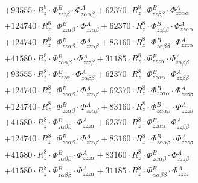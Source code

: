 \documentclass{article}
\begin{document}
\begin{subequations}
\begin{gather}
\begin{array}{c}
 \\[0.2em] 		 + 93555 \cdot R_{z}^{8} \cdot \Phi{}^{B}_{zzz\beta{}} \cdot \Phi{}^{A}_{z\alpha{}\alpha{}\beta{}}+ 62370 \cdot R_{z}^{8} \cdot \Phi{}^{B}_{zz\beta{}\beta{}} \cdot \Phi{}^{A}_{zz\alpha{}\alpha{}} 
 \\[0.2em] 		 + 124740 \cdot R_{z}^{8} \cdot \Phi{}^{B}_{zz\alpha{}\beta{}} \cdot \Phi{}^{A}_{zz\alpha{}\beta{}}+ 62370 \cdot R_{z}^{8} \cdot \Phi{}^{B}_{zz\beta{}\beta{}} \cdot \Phi{}^{A}_{zz\alpha{}\alpha{}} 
 \\[0.2em] 		 + 124740 \cdot R_{z}^{8} \cdot \Phi{}^{B}_{zz\alpha{}\beta{}} \cdot \Phi{}^{A}_{zz\alpha{}\beta{}}+ 83160 \cdot R_{z}^{8} \cdot \Phi{}^{B}_{z\alpha{}\beta{}\beta{}} \cdot \Phi{}^{A}_{zzz\alpha{}} 
 \\[0.2em] 		 + 41580 \cdot R_{z}^{8} \cdot \Phi{}^{B}_{z\alpha{}\alpha{}\beta{}} \cdot \Phi{}^{A}_{zzz\beta{}}+ 31185 \cdot R_{z}^{8} \cdot \Phi{}^{B}_{zzz\alpha{}} \cdot \Phi{}^{A}_{z\alpha{}\beta{}\beta{}} 
 \\[0.2em] 		 + 93555 \cdot R_{z}^{8} \cdot \Phi{}^{B}_{zzz\alpha{}} \cdot \Phi{}^{A}_{z\alpha{}\beta{}\beta{}}+ 62370 \cdot R_{z}^{8} \cdot \Phi{}^{B}_{zz\alpha{}\alpha{}} \cdot \Phi{}^{A}_{zz\beta{}\beta{}} 
 \\[0.2em] 		 + 124740 \cdot R_{z}^{8} \cdot \Phi{}^{B}_{zz\alpha{}\beta{}} \cdot \Phi{}^{A}_{zz\alpha{}\beta{}}+ 62370 \cdot R_{z}^{8} \cdot \Phi{}^{B}_{zz\alpha{}\alpha{}} \cdot \Phi{}^{A}_{zz\beta{}\beta{}} 
 \\[0.2em] 		 + 124740 \cdot R_{z}^{8} \cdot \Phi{}^{B}_{zz\alpha{}\beta{}} \cdot \Phi{}^{A}_{zz\alpha{}\beta{}}+ 83160 \cdot R_{z}^{8} \cdot \Phi{}^{B}_{z\alpha{}\alpha{}\beta{}} \cdot \Phi{}^{A}_{zzz\beta{}} 
 \\[0.2em] 		 + 41580 \cdot R_{z}^{8} \cdot \Phi{}^{B}_{z\alpha{}\beta{}\beta{}} \cdot \Phi{}^{A}_{zzz\alpha{}}+ 62370 \cdot R_{z}^{8} \cdot \Phi{}^{B}_{zz\alpha{}\alpha{}} \cdot \Phi{}^{A}_{zz\beta{}\beta{}} 
 \\[0.2em] 		 + 124740 \cdot R_{z}^{8} \cdot \Phi{}^{B}_{zz\alpha{}\beta{}} \cdot \Phi{}^{A}_{zz\alpha{}\beta{}}+ 83160 \cdot R_{z}^{8} \cdot \Phi{}^{B}_{z\alpha{}\alpha{}\beta{}} \cdot \Phi{}^{A}_{zzz\beta{}} 
 \\[0.2em] 		 + 41580 \cdot R_{z}^{8} \cdot \Phi{}^{B}_{z\alpha{}\beta{}\beta{}} \cdot \Phi{}^{A}_{zzz\alpha{}}+ 83160 \cdot R_{z}^{8} \cdot \Phi{}^{B}_{z\alpha{}\alpha{}\beta{}} \cdot \Phi{}^{A}_{zzz\beta{}} 
 \\[0.2em] 		 + 41580 \cdot R_{z}^{8} \cdot \Phi{}^{B}_{z\alpha{}\beta{}\beta{}} \cdot \Phi{}^{A}_{zzz\alpha{}}+ 31185 \cdot R_{z}^{8} \cdot \Phi{}^{B}_{\alpha{}\alpha{}\beta{}\beta{}} \cdot \Phi{}^{A}_{zzzz} 

\end{array}
\end{gather}
\end{subequations}
\end{document}
